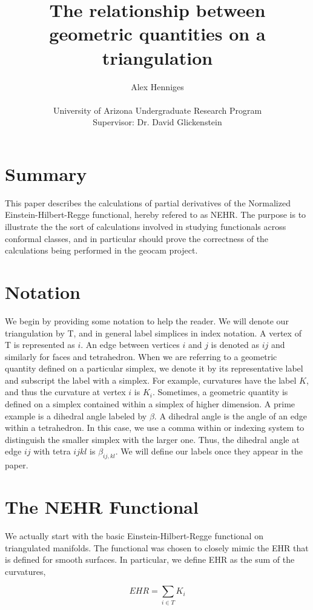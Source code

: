 \documentclass[12pt]{article}
\title{The relationship between geometric quantities on a triangulation}
\author{Alex Henniges \\ \\ University of Arizona Undergraduate Research Program\\
Supervisor: Dr. David Glickenstein\\
}
\begin{document}
\section{Summary}

This paper describes the calculations of partial derivatives of the Normalized Einstein-Hilbert-Regge functional, hereby refered to as NEHR. The purpose is to illustrate the the sort of calculations involved in studying functionals across conformal classes, and in particular should prove the correctness of the calculations being performed in the geocam project. \\

\section{Notation}

We begin by providing some notation to help the reader. We will denote our triangulation by T, and in general label simplices in index notation. A vertex of T is represented as ${i}$. An edge between vertices ${i}$ and ${j}$ is denoted as ${ij}$ and similarly for faces and tetrahedron. When we are referring to a geometric quantity defined on a particular simplex, we denote it by its representative label and subscript the label with a simplex. For example, curvatures have the label $K$, and thus the curvature at vertex ${i}$ is $K_i$. Sometimes, a geometric quantity is defined on a simplex contained within a simplex of higher dimension. A prime example is a dihedral angle labeled by $\beta$. A dihedral angle is the angle of an edge within a tetrahedron. In this case, we use a comma within or indexing system to distinguish the smaller simplex with the larger one. Thus, the dihedral angle at edge ${ij}$ with tetra ${ijkl}$ is $\beta_{ij,kl}$. We will define our labels once they appear in the paper. \\

\section{The NEHR Functional}

We actually start with the basic Einstein-Hilbert-Regge functional on triangulated manifolds. The functional was chosen to closely mimic the EHR that is defined for smooth surfaces. In particular, we define EHR as the sum of the curvatures,

\begin{equation}
EHR = \sum_{{i} \in T}{K_i}
\label{eq.EHR}
\end{equation}
\end{document}

